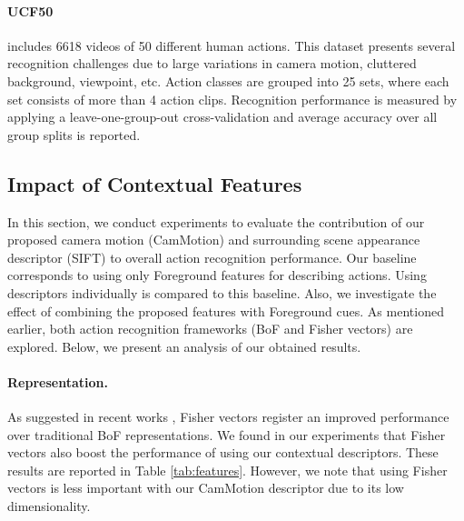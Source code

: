 \documentclass[runningheads]{llncs}
\begin{document}
\paragraph{UCF50} \cite{reddy2013} includes 6618 videos of 50 different human actions. This dataset presents several recognition challenges due to large variations in camera motion, cluttered background, viewpoint, etc. Action classes are grouped into 25 sets, where each set consists of more than 4 action clips. Recognition performance is measured by applying a leave-one-group-out cross-validation and average accuracy over all group splits is reported.


\subsection{Impact of Contextual Features}
In this section, we conduct experiments to evaluate the contribution of our proposed camera motion (CamMotion) and surrounding scene appearance descriptor (SIFT) to overall action recognition performance. Our baseline corresponds to using only Foreground features for describing actions. Using descriptors individually is compared to this baseline. Also, we investigate the effect of combining the proposed features with Foreground cues. As mentioned earlier, both action recognition frameworks (BoF and Fisher vectors) are explored. Below, we present an analysis of our obtained results.

\paragraph{Representation.} As suggested in recent works \cite{perronnin2010, wang2013, xwang2013}, Fisher vectors register an improved performance over traditional BoF representations. We found in our experiments that Fisher vectors also boost the performance of using our contextual descriptors. These results are reported in Table \ref{tab:features}. However, we note that using Fisher vectors is less important with our CamMotion descriptor due to its low dimensionality.
\end{document}
